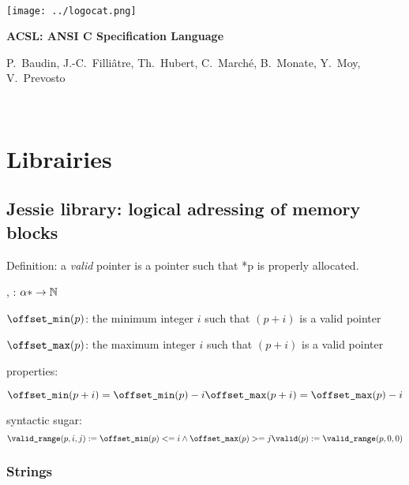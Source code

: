 \documentclass[a4paper,11pt,twoside,openright]{report}
\begin{document}
\sloppy

\begin{titlepage}
\begin{center}
~\vfill

\texttt{[image: ../logocat.png]}

\vspace{20mm}

{\Huge\bfseries ACSL: ANSI C Specification Language}

\vspace{20mm}

{P.~Baudin, J.-C.~Filli\^atre, Th.~Hubert,
  C.~March\'e, B.~Monate, Y.~Moy, V.~Prevosto}

\vfill ~
\end{center}
\end{titlepage}

\clearpage
\label{chap:contents}
\tableofcontents






\chapter{Librairies}
\label{chap:lib}

\section{Jessie library: logical adressing of memory blocks}

Definition: a \emph{valid} pointer is a pointer such that *p is properly
allocated.

\offsetmin, \offsetmax : $\alpha * \rightarrow \mathbb{N}$

$\texttt{{\textbackslash}offset\_min}(p)$: the minimum integer $i$ such that $(p+i)$ is a valid
pointer

$\texttt{{\textbackslash}offset\_max}(p)$: the maximum integer $i$ such that $(p+i)$ is a valid
pointer

properties:

\[
\texttt{{\textbackslash}offset\_min}(p+i) = \texttt{{\textbackslash}offset\_min}(p)-i
\texttt{{\textbackslash}offset\_max}(p+i) = \texttt{{\textbackslash}offset\_max}(p)-i
\]

syntactic sugar:
\[
\texttt{{\textbackslash}valid\_range}(p,i,j) := \texttt{{\textbackslash}offset\_min}(p) <= i \land \texttt{{\textbackslash}offset\_max}(p) >= j
\texttt{{\textbackslash}valid}(p) := \texttt{{\textbackslash}valid\_range}(p,0,0)
\]


\subsection{Strings}
\end{document}
